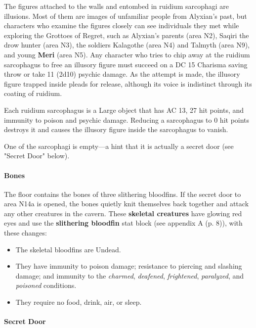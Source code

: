 \documentclass[a4paper, 11pt, bg=full, twocolumn, nooutline]{dndbook}
\begin{document}
The figures attached to the walls and entombed in ruidium sarcophagi are illusions. Most of them are images of unfamiliar people from Alyxian's past, but characters who examine the figures closely can see individuals they met while exploring the Grottoes of Regret, such as Alyxian's parents (area N2), Saqiri the drow hunter (area N3), the soldiers Kalagothe (area N4) and Talmyth (area N9), and young \textbf{Meri} (area N5). Any character who tries to chip away at the ruidium sarcophagus to free an illusory figure must succeed on a DC 15 Charisma saving throw or take 11 (2d10) psychic damage. As the attempt is made, the illusory figure trapped inside pleads for release, although its voice is indistinct through its coating of ruidium.

Each ruidium sarcophagus is a Large object that has AC 13, 27 hit points, and immunity to poison and psychic damage. Reducing a sarcophagus to 0 hit points destroys it and causes the illusory figure inside the sarcophagus to vanish.

One of the sarcophagi is empty---a hint that it is actually a secret door (see "Secret Door" below).

\paragraph{Bones}

The floor contains the bones of three slithering bloodfins. If the secret door to area N14a is opened, the bones quietly knit themselves back together and attack any other creatures in the cavern. These \textbf{skeletal creatures} have glowing red eyes and use the \textbf{slithering bloodfin} stat block (see appendix A (p. 8)), with these changes:

\begin{itemize}
\item The skeletal bloodfins are Undead.
\item They have immunity to poison damage; resistance to piercing and slashing damage; and immunity to the \textit{charmed}, \textit{deafened}, \textit{frightened}, \textit{paralyzed}, and \textit{poisoned} conditions.
\item They require no food, drink, air, or sleep.
\end{itemize}

\paragraph{Secret Door}
\end{document}
